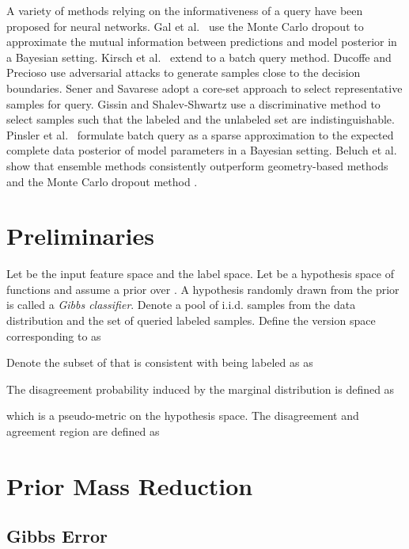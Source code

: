 \documentclass[runningheads, envcountsame, a4paper]{llncs}
\newcommand{\etal}{et al.}
\begin{document}
A variety of methods relying on the informativeness of a query have been proposed for neural networks. Gal \etal~\cite{Gal17} use the Monte Carlo dropout to approximate the mutual information between predictions and model posterior \cite{Houlsby11} in a Bayesian setting. Kirsch \etal~\cite{Kirsch19} extend \cite{Houlsby11,Gal17} to a batch query method. Ducoffe and Precioso \cite{Ducoffe18} use adversarial attacks to generate samples close to the decision boundaries. Sener and Savarese \cite{Sener18} adopt a core-set approach to select representative samples for query. Gissin and Shalev-Shwartz \cite{Gissin19} use a discriminative method to select samples such that the labeled and the unlabeled set are indistinguishable. Pinsler \etal~\cite{Pinsler19} formulate batch query as a sparse approximation to the expected complete data posterior of model parameters in a Bayesian setting. Beluch \etal~\cite{Beluch18} show that ensemble methods consistently outperform geometry-based methods \cite{Sener18} and the Monte Carlo dropout method \cite{Gal16,Gal17}. 



\section{Preliminaries}
\label{sec:preliminaries}

Let  be the input feature space and  the label space. Let  be a hypothesis space of functions  and assume a prior  over . A hypothesis randomly drawn from the prior is called a \textit{Gibbs classifier}. Denote  a pool of i.i.d. samples from the data distribution  and  the set of queried labeled samples. Define the version space  corresponding to  as

Denote the subset of  that is consistent with  being labeled as  as

The disagreement probability induced by the marginal distribution  is defined as

which is a pseudo-metric on the hypothesis space. The disagreement and agreement region are defined as






\section{Prior Mass Reduction}
\label{sec:prior_mass_reduction}


\subsection{Gibbs Error}
\label{sec:gibbs_error}
\end{document}
